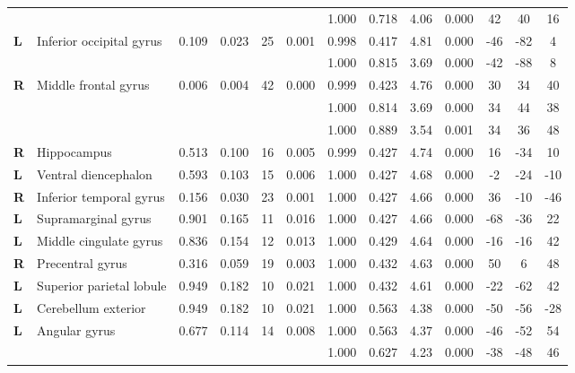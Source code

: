 \begin{landscape}
\begin{table}[!ht]
\begin{tabular}{ll|cccc|cccc|ccc}
        & & & & & & 1.000 & 0.718 & 4.06 & 0.000 & 42 & 40 & 16 \\
        \textbf{L} & Inferior occipital gyrus & 0.109 & 0.023 & 25 & 0.001 & 0.998 & 0.417 & 4.81 & 0.000 & -46 & -82 & 4 \\
        & & & & & & 1.000 & 0.815 & 3.69 & 0.000 & -42 & -88 & 8 \\
        \textbf{R} & Middle frontal gyrus & 0.006 & 0.004 & 42 & 0.000 & 0.999 & 0.423 & 4.76 & 0.000 & 30 & 34 & 40 \\
        & & & & & & 1.000 & 0.814 & 3.69 & 0.000 & 34 & 44 & 38 \\
        & & & & & & 1.000 & 0.889 & 3.54 & 0.001 & 34 & 36 & 48 \\
        \textbf{R} & Hippocampus & 0.513 & 0.100 & 16 & 0.005 & 0.999 & 0.427 & 4.74 & 0.000 & 16 & -34 & 10 \\
        \textbf{L} & Ventral diencephalon & 0.593 & 0.103 & 15 & 0.006 & 1.000 & 0.427 & 4.68 & 0.000 & -2 & -24 & -10 \\
        \textbf{R} & Inferior temporal gyrus & 0.156 & 0.030 & 23 & 0.001 & 1.000 & 0.427 & 4.66 & 0.000 & 36 & -10 & -46 \\
        \textbf{L} & Supramarginal gyrus & 0.901 & 0.165 & 11 & 0.016 & 1.000 & 0.427 & 4.66 & 0.000 & -68 & -36 & 22 \\
        \textbf{L} & Middle cingulate gyrus & 0.836 & 0.154 & 12 & 0.013 & 1.000 & 0.429 & 4.64 & 0.000 & -16 & -16 & 42 \\
        \textbf{R} & Precentral gyrus & 0.316 & 0.059 & 19 & 0.003 & 1.000 & 0.432 & 4.63 & 0.000 & 50 & 6 & 48 \\
        \textbf{L} & Superior parietal lobule & 0.949 & 0.182 & 10 & 0.021 & 1.000 & 0.432 & 4.61 & 0.000 & -22 & -62 & 42 \\
        \textbf{L} & Cerebellum exterior & 0.949 & 0.182 & 10 & 0.021 & 1.000 & 0.563 & 4.38 & 0.000 & -50 & -56 & -28 \\
        \textbf{L} & Angular gyrus & 0.677 & 0.114 & 14 & 0.008 & 1.000 & 0.563 & 4.37 & 0.000 & -46 & -52 & 54 \\
        & & & & & & 1.000 & 0.627 & 4.23 & 0.000 & -38 & -48 & 46 \\

\end{tabular}
\end{table}
\end{landscape}
